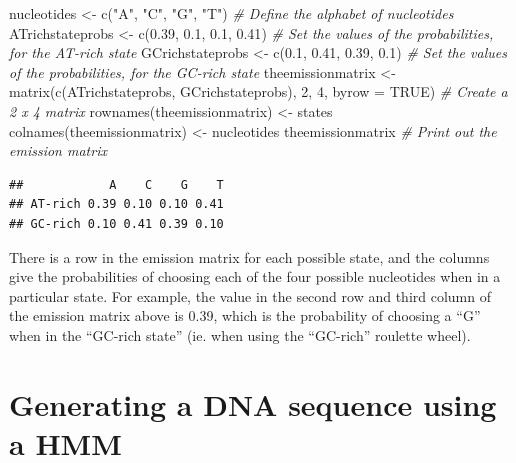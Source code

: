 \documentclass[
]{book}
\newenvironment{Shaded}{\begin{snugshade}}{\end{snugshade}}
\newcommand{\AttributeTok}[1]{\textcolor[rgb]{0.77,0.63,0.00}{#1}}
\newcommand{\CommentTok}[1]{\textcolor[rgb]{0.56,0.35,0.01}{\textit{#1}}}
\newcommand{\ConstantTok}[1]{\textcolor[rgb]{0.00,0.00,0.00}{#1}}
\newcommand{\DecValTok}[1]{\textcolor[rgb]{0.00,0.00,0.81}{#1}}
\newcommand{\FloatTok}[1]{\textcolor[rgb]{0.00,0.00,0.81}{#1}}
\newcommand{\FunctionTok}[1]{\textcolor[rgb]{0.00,0.00,0.00}{#1}}
\newcommand{\NormalTok}[1]{#1}
\newcommand{\OtherTok}[1]{\textcolor[rgb]{0.56,0.35,0.01}{#1}}
\newcommand{\StringTok}[1]{\textcolor[rgb]{0.31,0.60,0.02}{#1}}
\begin{document}
\begin{Shaded}
\begin{Highlighting}[]
\NormalTok{nucleotides         }\OtherTok{\textless{}{-}} \FunctionTok{c}\NormalTok{(}\StringTok{"A"}\NormalTok{, }\StringTok{"C"}\NormalTok{, }\StringTok{"G"}\NormalTok{, }\StringTok{"T"}\NormalTok{)   }\CommentTok{\# Define the alphabet of nucleotides}
\NormalTok{ATrichstateprobs    }\OtherTok{\textless{}{-}} \FunctionTok{c}\NormalTok{(}\FloatTok{0.39}\NormalTok{, }\FloatTok{0.1}\NormalTok{, }\FloatTok{0.1}\NormalTok{, }\FloatTok{0.41}\NormalTok{) }\CommentTok{\# Set the values of the probabilities, for the AT{-}rich state}
\NormalTok{GCrichstateprobs    }\OtherTok{\textless{}{-}} \FunctionTok{c}\NormalTok{(}\FloatTok{0.1}\NormalTok{, }\FloatTok{0.41}\NormalTok{, }\FloatTok{0.39}\NormalTok{, }\FloatTok{0.1}\NormalTok{) }\CommentTok{\# Set the values of the probabilities, for the GC{-}rich state}
\NormalTok{theemissionmatrix }\OtherTok{\textless{}{-}} \FunctionTok{matrix}\NormalTok{(}\FunctionTok{c}\NormalTok{(ATrichstateprobs, GCrichstateprobs), }\DecValTok{2}\NormalTok{, }\DecValTok{4}\NormalTok{, }\AttributeTok{byrow =} \ConstantTok{TRUE}\NormalTok{) }\CommentTok{\# Create a 2 x 4 matrix}
\FunctionTok{rownames}\NormalTok{(theemissionmatrix) }\OtherTok{\textless{}{-}}\NormalTok{ states}
\FunctionTok{colnames}\NormalTok{(theemissionmatrix) }\OtherTok{\textless{}{-}}\NormalTok{ nucleotides}
\NormalTok{theemissionmatrix                              }\CommentTok{\# Print out the emission matrix}
\end{Highlighting}
\end{Shaded}

\begin{verbatim}
##            A    C    G    T
## AT-rich 0.39 0.10 0.10 0.41
## GC-rich 0.10 0.41 0.39 0.10
\end{verbatim}

There is a row in the emission matrix for each possible state, and the columns give the probabilities of choosing each of the four possible nucleotides when in a particular state. For example, the value in the second row and third column of the emission matrix above is 0.39, which is the probability of choosing a ``G'' when in the ``GC-rich state'' (ie. when using the ``GC-rich'' roulette wheel).

\hypertarget{generating-a-dna-sequence-using-a-hmm}{%
\section{Generating a DNA sequence using a HMM}\label{generating-a-dna-sequence-using-a-hmm}}
\end{document}
